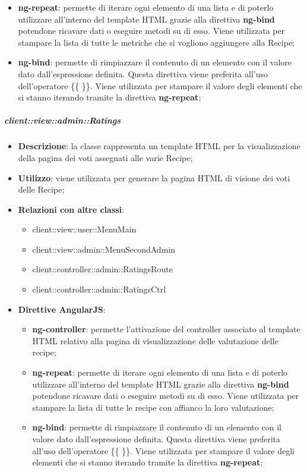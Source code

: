 \begin{itemize}
\begin{itemize}
						\item \textbf{ng-repeat}: permette di iterare ogni elemento di una lista e di poterlo utilizzare all'interno del template HTML grazie alla direttiva \textbf{ng-bind} potendone ricavare dati o eseguire metodi su di esso. Viene utilizzata per stampare la lista di tutte le metriche che si vogliono aggiungere alla Recipe;
						\item \textbf{ng-bind}: permette di rimpiazzare il contenuto di un elemento con il valore dato dall'espressione definita. Questa direttiva viene preferita all'uso dell'operatore \{\{ \}\}. Viene utilizzata per stampare il valore degli elementi che si stanno iterando tramite la direttiva \textbf{ng-repeat};
					\end{itemize}
			\end{itemize}

		\subparagraph{client::view::admin::Ratings} %
		\label{subp:bdsm_app_client_view_admin_ratings}

			\begin{itemize}
				\item \textbf{Descrizione}: la classe rappresenta un template HTML per la visualizzazione della pagina dei voti assegnati alle varie Recipe;
				\item \textbf{Utilizzo}: viene utilizzata per generare la pagina HTML di visione dei voti delle Recipe;
				\item \textbf{Relazioni con altre classi}:
					\begin{itemize}
						\item client::view::user::MenuMain
						\item client::view::admin::MenuSecondAdmin
						\item client::controller::admin::RatingsRoute
						\item client::controller::admin::RatingsCtrl
					\end{itemize}
				\item \textbf{Direttive AngularJS}:
					\begin{itemize}
						\item \textbf{ng-controller}: permette l'attivazione del controller associato al template HTML relativo alla pagina di visualizzazione delle valutazione delle recipe;
						\item \textbf{ng-repeat}: permette di iterare ogni elemento di una lista e di poterlo utilizzare all'interno del template HTML grazie alla direttiva \textbf{ng-bind} potendone ricavare dati o eseguire metodi su di esso. Viene utilizzata per stampare la lista di tutte le recipe con affianco la loro valutazione;
						\item \textbf{ng-bind}: permette di rimpiazzare il contenuto di un elemento con il valore dato dall'espressione definita. Questa direttiva viene preferita all'uso dell'operatore \{\{ \}\}. Viene utilizzata per stampare il valore degli elementi che si stanno iterando tramite la direttiva \textbf{ng-repeat};
					\end{itemize}
			\end{itemize}

